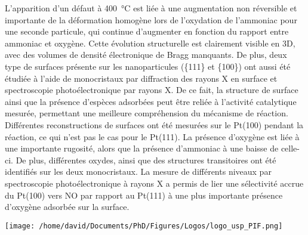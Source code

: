 \begin{mdframed}[linecolor=Prune,linewidth=1]
\begin{multicols}{2}
L'apparition d'un défaut à \qty{400}{\degreeCelsius} est liée à une augmentation non réversible et importante de la déformation homogène lors de l'oxydation de l'ammoniac pour une seconde particule, qui continue d'augmenter en fonction du rapport entre ammoniac et oxygène.
Cette évolution structurelle est clairement visible en 3D, avec des volumes de densité électronique de Bragg manquants.
De plus, deux type de surfaces présente sur les nanoparticules (\{111\} et \{100\}) ont aussi été étudiée à l'aide de monocristaux par diffraction des rayons X en surface et spectroscopie photoélectronique par rayons X.
De ce fait, la structure de surface ainsi que la présence d'espèces adsorbées peut être reliée à l'activité catalytique mesurée, permettant une meilleure compréhension du mécanisme de réaction.
Différentes reconstructions de surfaces ont été mesurées sur le Pt(100) pendant la réaction, ce qui n'est pas le cas pour le Pt(111).
La présence d'oxygène est liée à une importante rugosité, alors que la présence d'ammoniac à une baisse de celle-ci.
De plus, différentes oxydes, ainsi que des structures transitoires ont été identifiés sur les deux monocristaux.
La mesure de différents niveaux par spectroscopie photoélectronique à rayons X a permis de lier une sélectivité accrue du Pt(100) vers NO par rapport au Pt(111) à une plus importante présence d'oxygène adsorbée sur la surface.
\end{multicols}

\end{mdframed}

\newpage
\thispagestyle{empty}

\lhead{}
\rhead{}
\rfoot{}
\cfoot{}
\lfoot{}

\noindent
\texttt{[image: /home/david/Documents/PhD/Figures/Logos/logo\_usp\_PIF.png]}
\vspace{0.5cm}

\small

